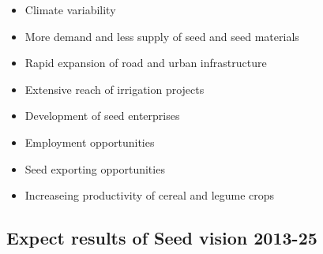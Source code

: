 \documentclass[
  openany]{book}
\providecommand{\tightlist}{%
  \setlength{\itemsep}{0pt}\setlength{\parskip}{0pt}}
\begin{document}
\begin{itemize}
\tightlist
\item
  Climate variability
\item
  More demand and less supply of seed and seed materials
\item
  Rapid expansion of road and urban infrastructure
\item
  Extensive reach of irrigation projects
\item
  Development of seed enterprises
\item
  Employment opportunities
\item
  Seed exporting opportunities
\item
  Increaseing productivity of cereal and legume crops
\end{itemize}

\hypertarget{expect-results-of-seed-vision-2013-25}{%
\subsection{Expect results of Seed vision 2013-25}\label{expect-results-of-seed-vision-2013-25}}
\end{document}
